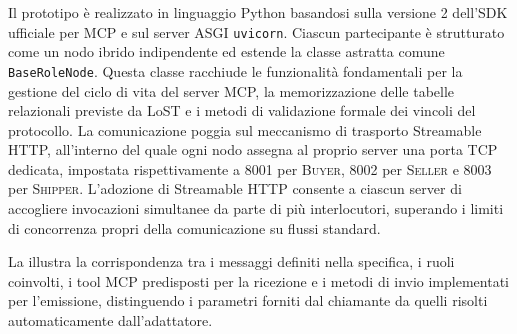 Il prototipo è realizzato in linguaggio Python basandosi sulla versione 2 dell'SDK ufficiale per MCP e sul server ASGI \texttt{uvicorn}. Ciascun partecipante è strutturato come un nodo ibrido indipendente ed estende la classe astratta comune \lstinline|BaseRoleNode|. Questa classe racchiude le funzionalità fondamentali per la gestione del ciclo di vita del server MCP, la memorizzazione delle tabelle relazionali previste da LoST e i metodi di validazione formale dei vincoli del protocollo. La comunicazione poggia sul meccanismo di trasporto Streamable HTTP, all'interno del quale ogni nodo assegna al proprio server una porta TCP dedicata, impostata rispettivamente a 8001 per \textsc{Buyer}, 8002 per \textsc{Seller} e 8003 per \textsc{Shipper}. L'adozione di Streamable HTTP consente a ciascun server di accogliere invocazioni simultanee da parte di più interlocutori, superando i limiti di concorrenza propri della comunicazione su flussi standard.

La  illustra la corrispondenza tra i messaggi definiti nella specifica, i ruoli coinvolti, i tool MCP predisposti per la ricezione e i metodi di invio implementati per l'emissione, distinguendo i parametri forniti dal chiamante da quelli risolti automaticamente dall'adattatore.

